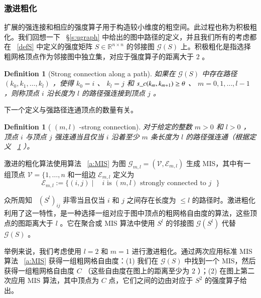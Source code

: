\documentclass[12pt]{acta_2011xz}
\newtheorem{definition}[theorem]{Definition}
\begin{document}
   \subsubsection{激进粗化  }    扩展的强连接和相应的强度算子用于构造较小维度的粗空间。此过程也称为积极粗化。我们回想一下~    \S       \ref{s:ugraph}    中给出的图中路径的定义，并且我们所有的考虑都在~    \eqref{defS}    中定义的强度矩阵
   $S\in \mathbb{R}^{n\times n}$    的邻接图    $\mathcal{G}(S)$    上。积极粗化是指选择粗网格顶点作为邻接图中独立集，对应于强度算子的距离大于    $2$    。  

   \begin{definition}[Strong connection along a path]   \label{def:extend-strong-connection-1}    如果在    $\mathcal{G}(S)$    中存在路径    $(k_0, k_1, \dots, k_l)$    ，使得    $k_0=i$    、    $k_l=j$    和    $s\_c(k_m, k_{m+1})\ge \theta$    、    $m=0, 1, \dots, l-1$    ，则称顶点    $i$    沿长度为    $l$    的路径强连接到顶点    $j$    。  \end{definition}    下一个定义与强路径连通顶点的数量有关。
   \begin{definition}[        $(m,l)$        -strong connection]   \label{def:extend-strong-connection-2}    对于给定的整数    $m>0$    和    $l>0$    ，顶点    $i$    与顶点    $j$    强连通当且仅当    $i$    沿着至少    $m$    条长度为    $l$    的路径强连通（根据定义~    \ref{def:extend-strong-connection-1}    ）。  \end{definition}     

激进的粗化算法使用算法~    \ref{a:MIS}    为图
   $\mathcal{G}_{m,l}=(\mathcal{V},\mathcal{E}_{m,l})$    生成 MIS，其中有一组顶点    $\mathcal{V}= \{ 1,\ldots,n$    和一组边
   $\mathcal{E}_{m,l}$    定义为
   \begin{equation}\label{e:eml}
\mathcal{E}_{m,l} :=  \{ (i,j)\;\big|\;\;\mbox{        $i$         is         $(m,l)$         strongly connected to         $j$        }  \} 
\end{equation}     

众所周知~    \cite{2010DiestelR-aa}    
   $(S^{l})_{ij}$    非零当且仅当    $i$    和    $j$    之间存在长度为
   $\le l$    的路径时。激进粗化利用了这一特性，是一种选择一组对应于图中顶点的粗网格自由度的算法，这些顶点的图距离大于    $l$    。它在聚合或 MIS 算法中使用    $S^{l}$    的邻接图
   $\mathcal{G}(S^l)$    代替    $\mathcal{G}(S)$   。  

举例来说，我们考虑使用    $l=2$    和
   $m=1$    进行激进粗化。通过两次应用标准 MIS 算法~    \ref{a:MIS}    获得一组粗网格自由度：(1) 我们在    $\mathcal{G}(S)$    中找到一个 MIS，然后获得一组粗网格自由度    $C$   （这些自由度在图上的距离至少为    $2$   ）；(2) 在图上第二次应用 MIS 算法，其中顶点为
   $C$    点，它们之间的边由对应于
   $S^{2}$    的强度算子给出。  
\end{document}
